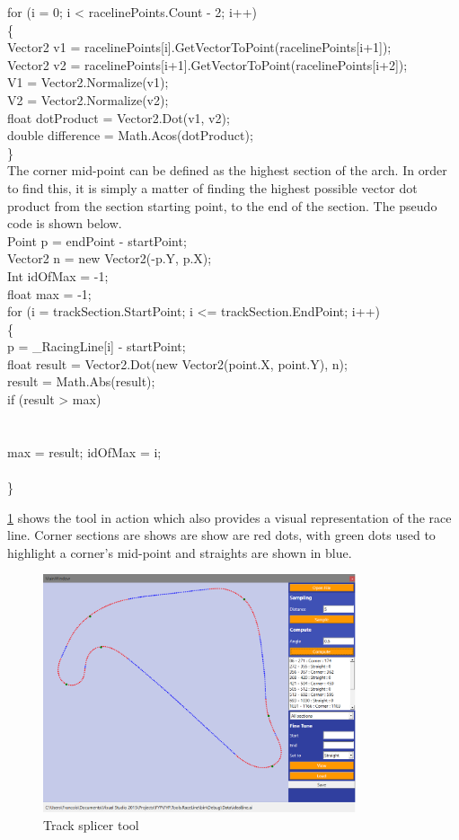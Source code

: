 for (i = 0; i < racelinePoints.Count - 2; i++)\\
\{\\
Vector2 v1 = racelinePoints[i].GetVectorToPoint(racelinePoints[i+1]);\\
Vector2 v2 = racelinePoints[i+1].GetVectorToPoint(racelinePoints[i+2]);\\
V1 = Vector2.Normalize(v1);\\
V2 = Vector2.Normalize(v2);\\
float dotProduct = Vector2.Dot(v1, v2);\\
double difference = Math.Acos(dotProduct);\\
\}\\

The corner mid-point can be defined as the highest section of the arch. In order to find this, it is simply a matter of finding the highest possible vector dot product from the section starting point, to the end of the section. The pseudo code is shown below.\\

Point p = endPoint - startPoint;\\
Vector2 n = new Vector2(-p.Y, p.X);\\
Int idOfMax = -1;\\
float max = -1;\\
for (i = trackSection.StartPoint; i <= trackSection.EndPoint; i++)\\
\{\\
p = \_RacingLine[i] - startPoint;\\
float result = Vector2.Dot(new Vector2(point.X, point.Y), n);\\
result = Math.Abs(result);\\
if (result > max)\\
\\{\\
max = result;
idOfMax = i;
\\}\\
\}

\ref{fig:TrackSplicerTool} shows the tool in action which also provides a visual representation of the race line. Corner sections are shows are show are red dots, with green dots used to highlight a corner’s mid-point and straights are shown in blue.

\begin{figure}[!htb]
	\centering
	\includegraphics[height=7cm]{images/tracksplicertool}
	\caption{Track splicer tool}
	\label{fig:TrackSplicerTool}
\end{figure}

